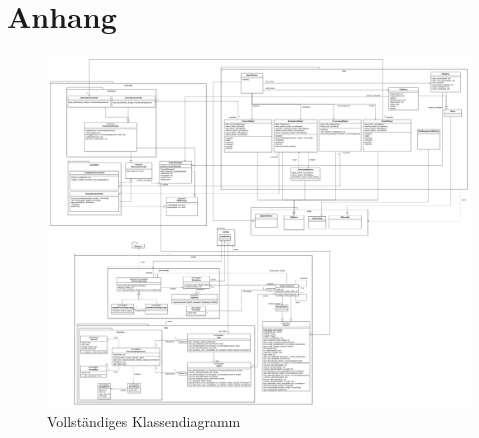 \documentclass{article}
\begin{document}
\section{Anhang}
\begin{figure}[H]%
    \centering
    \includegraphics[width=13cm]{entwurf/Entwurf_dokument/img/KlassendiagrammAlles.png}
    \caption{Vollständiges Klassendiagramm}
    \label{fig:CompleteClassDiagram}
\end{figure}



\printglossary
\end{document}
